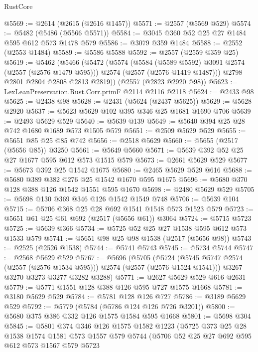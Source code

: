 \begin{lexlean}{RustCore}
\begin{coremodule}
@5569 := @2614 (@2615 (@2616 @1457))
@5571 := @2557 (@5569 @529)
@5574 := @5482 (@5486 (@5566 @5571))
@5584 := @3045 @360 @52 @25 @27 @1484 @595 @612 @573 @1478 @579
@5586 := @3079 @359 @1484
@5588 := @2552 (@2553 @1484)
@5589 := @5586 @5588
@5592 := @2557 (@2559 @359 @25)
@5619 := @5462
    (@5466
      (@5472
        (@5574
          (@5584 (@5589 @5592) @3091 @2574 (@2557 (@2576 @1479 @595)))
          @2574
          (@2557 (@2576 @1419 @1487)))
        @2798
        @2801
        @2804
        @2808
        @2813
        @2819))
    (@2557 (@2823 @2920 @98))
@5623 := LexLeanPreservation.Rust.Corr.primF @2114 @2116 @2118
@5624 := @2433 @98
@5625 := @2438 @98
@5628 := @2431 (@5624 (@2437 @5625))
@5629 := @5628 @2920
@5637 := @5623 @5629 @102 @395 @346 @25 @1681 @1690 @706
@5639 := @2493 @5629 @529
@5640 := @5639 @139
@5649 := @5640 @394 @25 @28 @742 @1680 @1689 @573 @1505 @579
@5651 := @2509 @5629 @529
@5655 := @5651 @85 @25 @85 @742
@5656 := @2518 @5629
@5660 := @5655 (@2517 (@5656 @85)) @3250
@5661 := @5649 @5660
@5671 := @5639 @392 @52 @25 @27 @1677 @595 @612 @573 @1515 @579
@5673 := @2661 @5629 @529
@5677 := @5673 @392 @25 @1542 @1675
@5680 := @2465 @5629 @529 @616
@5688 := @5680 @389 @382 @276 @25 @1542 @1670 @595 @1675
@5696 := @5680 @370 @128 @388 @126 @1542 @1551 @595 @1670
@5698 := @2480 @5629 @529
@5705 := @5698 @130 @369 @346 @126 @1542 @1549 @748
@5706 := @5639 @104
@5715 := @5706 @368 @25 @28 @692 @1541 @1548 @573 @1523 @579
@5723 := @5651 @61 @25 @61 @692 (@2517 (@5656 @61)) @3064
@5724 := @5715 @5723
@5725 := @5639 @366
@5734 := @5725 @52 @25 @27 @1538 @595 @612 @573 @1533 @579
@5741 := @5651 @98 @25 @98 @1538 (@2517 (@5656 @98))
@5743 := @2525 (@2526 @1538)
@5744 := @5741 @5743
@5745 := @5734 @5744
@5747 := @2568 @5629 @529
@5767 := @5696
    (@5705
      (@5724 (@5745 @5747 @2574 (@2557 (@2576 @1534 @595))) @2574 (@2557 (@2576 @1524 @1541)))
      @3267
      @3270
      @3273
      @3277
      @3282
      @3288)
@5771 := @2627 @5629 @529 @616 @2631
@5779 := @5771 @1551 @128 @388 @126 @595 @727 @1575 @1668
@5781 := @3180 @5629 @529
@5784 := @5781 @128 @126 @727
@5786 := @3189 @5629 @529
@5792 := @5779 (@5784 (@5786 @124 @126 @726 @3201))
@5800 := @5680 @375 @386 @332 @126 @1575 @1584 @595 @1668
@5801 := @5698 @304
@5845 := @5801
    @374
    @346
    @126
    @1575
    @1582
    @1223
    (@5725
      @373
      @25
      @28
      @1538
      @1574
      @1581
      @573
      @1557
      @579
      @5744
      (@5706
        @52
        @25
        @27
        @692
        @595
        @612
        @573
        @1567
        @579
        @5723

\end{coremodule}
\end{lexlean}
